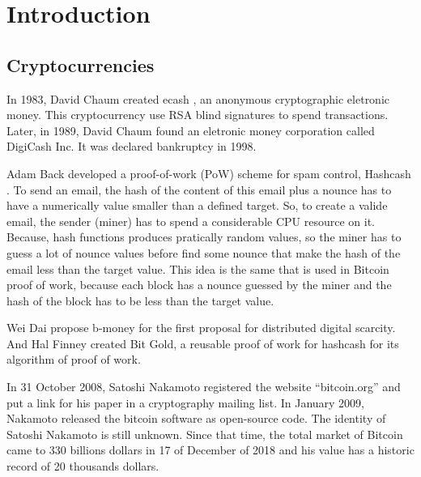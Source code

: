 \documentclass[12pt]{article}
\begin{document}

\tableofcontents
\pagebreak

\renewcommand{\thesection}{\arabic{section}}
\section{Introduction}

\subsection{Cryptocurrencies}

In 1983, David Chaum created ecash \cite{panurach1996money} , an anonymous cryptographic eletronic money.
This cryptocurrency use RSA blind signatures \cite{chaum1983blind} to spend transactions.
Later, in 1989, David Chaum found an eletronic money corporation called DigiCash Inc.
It was declared bankruptcy in 1998.

Adam Back developed a proof-of-work (PoW) scheme for spam control, Hashcash \cite{back2002hashcash}.
To send an email, the hash of the content of this email plus a nounce has to have a numerically value smaller than a defined target.
So, to create a valide email, the sender (miner) has to spend a considerable CPU resource on it.
Because, hash functions produces pratically random values, so the miner has to guess a lot of nounce values before find some nounce that make the hash of the email less than the target value.
This idea is the same that is used in Bitcoin proof of work, because each block has a nounce guessed by the miner and the hash of the block has to be less than the target value.

Wei Dai propose b-money \cite{dai1998b} for the first proposal for distributed digital scarcity.
And Hal Finney created Bit Gold, a reusable proof of work for hashcash for its algorithm of proof of work.

In 31 October 2008, Satoshi Nakamoto registered the website ``bitcoin.org'' and put a link for his paper \cite{nakamoto2008bitcoin} in a cryptography mailing list.
In January 2009, Nakamoto released the bitcoin software as open-source code.
The identity of Satoshi Nakamoto is still unknown.
Since that time, the total market of Bitcoin came to 330 billions dollars in 17 of December of 2018
and his value has a historic record of 20 thousands dollars.
\end{document}
